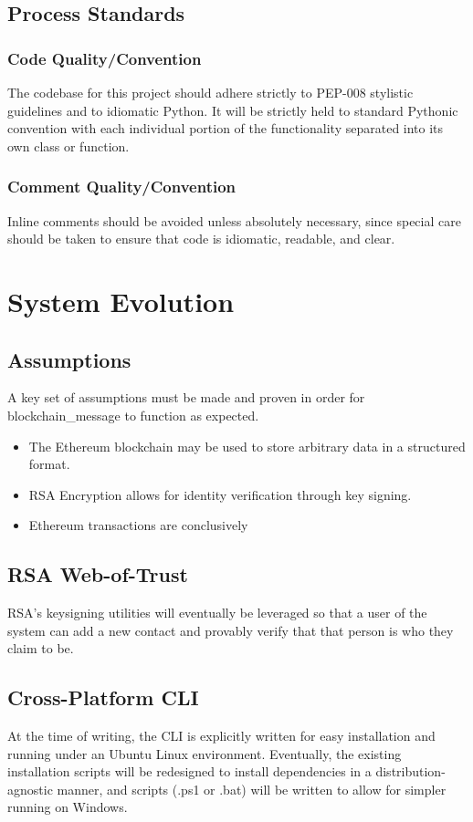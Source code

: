 \documentclass[titlepage]{report}
\begin{document}
\subsection{Process Standards}
\subsubsection{Code Quality/Convention}
The codebase for this project should adhere strictly to PEP-008 stylistic guidelines and to idiomatic Python. It will be strictly held to standard Pythonic convention with each individual portion of the functionality separated into its own class or function.

\subsubsection{Comment Quality/Convention}
Inline comments should be avoided unless absolutely necessary, since special care should be taken to ensure that code is idiomatic, readable, and clear.

\section{System Evolution}
\subsection{Assumptions}
A key set of assumptions must be made and proven in order for blockchain\_message to function as expected.
\begin{itemize}
\item The Ethereum blockchain may be used to store arbitrary data in a structured format.
\item RSA Encryption allows for identity verification through key signing.
\item Ethereum transactions are conclusively 
\end{itemize}

\subsection{RSA Web-of-Trust}
RSA's keysigning utilities will eventually be leveraged so that a user of the system can add a new contact and provably verify that that person is who they claim to be.

\subsection{Cross-Platform CLI}
At the time of writing, the CLI is explicitly written for easy installation and running under an Ubuntu Linux environment. Eventually, the existing installation scripts will be redesigned to install dependencies in a distribution-agnostic manner, and scripts (.ps1 or .bat) will be written to allow for simpler running on Windows.
\end{document}
